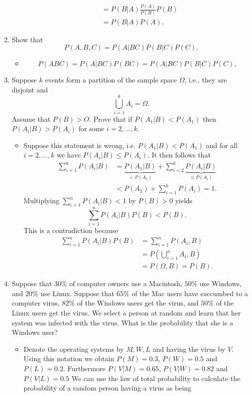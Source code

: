 \documentclass{article}
\begin{document}
\begin{enumerate}
\begin{itemize}
$$\begin{aligned}
			& = P(B|A) \frac{P(A)}{P(B)} P(B) \\
			&= P(B|A)P(A).
			\end{aligned}
			$$
		\end{itemize}
	\item Show that
	$$
	P(A, B, C) = P(A|BC)P(B|C)P(C).
	$$
		\begin{itemize}
			\item
			$$
			P(ABC) = P(A|BC)P(BC) = P(A|BC)P(B|C)P(C).
			$$
		\end{itemize}
	\item Suppose $k$ events form a partition of the sample space $\Omega$, i.e., they are disjoint and 
	$$
	\bigcup_{i = 1}^k A_i = \Omega.
	$$
	Assume that $P(B) > O$. Prove that if $P(A_1|B) < P(A_1)$ then $P(A_i|B) > P(A_i)$ for some $i = 2, \dots, k$.
		\begin{itemize}
			\item Suppose this statement is wrong, i.e. $P(A_1|B) < P(A_1)$ and for all $i = 2, \dots, k$ we have $P(A_i|B) \leq P(A_i)$. It then follows that
			$$
			\begin{aligned}
			\sum_{i = 1}^k P(A_i|B) &= \underbrace{P(A_1|B)}_{< P(A_1)} + \sum_{i = 2}^k \underbrace{P(A_i|B)}_{\leq P(A_i)} \\
			&< P(A_1) + \sum_{i = 1}^k P(A_i) = 1.
			\end{aligned}
			$$
			Multiplying $\sum_{i = 1}^n P(A_i|B) < 1$ by $P(B) > 0$ yields
			$$
			\sum_{i = 1}^n P(A_i|B)P(B) < P(B).
			$$
			This is a contradiction because
			$$
			\begin{aligned}
			\sum_{i = 1}^n P(A_i|B)P(B) &= \sum_{i = 1}^n P(A_i, B) \\
			&= P\left(\bigcup_{i = 1}^n A_i , B\right) \\
			&= P(\Omega, B) = P(B).
			\end{aligned}
			$$
		\end{itemize}
	\item Suppose that $30\%$ of computer owners use a Macintosh, $50\%$ use Windows, and $20\%$ use Linux. Suppose that $65\%$ of the Mac users have succumbed to a computer virus, $82\%$ of the Windows users get the virus, and $50\%$ of the Linux users get the virus. We select a person at random and learn that her system was infected with the virus. What is the probability that she is a Windows user?
		\begin{itemize}
			\item Denote the operating systems by $M, W, L$ and having the virus by $V$. Using this notation we obtain $P(M) = 0.3$, $P(W) = 0.5$ and $P(L) = 0.2$. Furthermore $P(V|M) = 0.65$, $P(V|W) = 0.82$ and $P(V|L) = 0.5$ We can use the law of total probability to calculate the probability of a random person having a virus as being

\end{itemize}
\end{enumerate}
\end{document}
